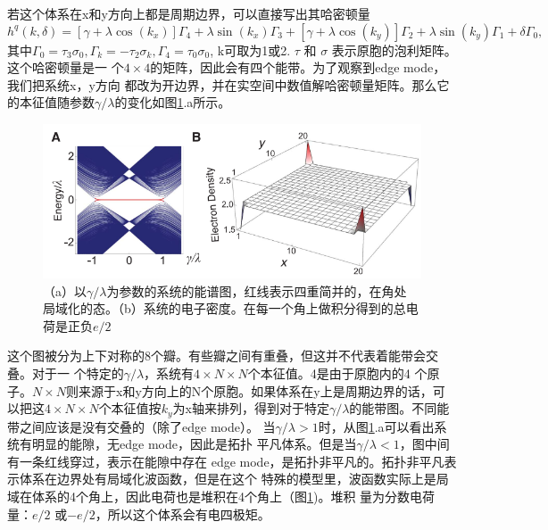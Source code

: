若这个体系在x和y方向上都是周期边界，可以直接写出其哈密顿量
\begin{equation}
h^{q}(k, \delta)=\left[\gamma+\lambda \cos \left(k_{x}\right)\right] \Gamma_{4}+\lambda \sin \left(k_{x}\right) \Gamma_{3}+\left[\gamma+\lambda \cos \left(k_{y}\right)\right] \Gamma_{2}+\lambda \sin \left(k_{y}\right) \Gamma_{1}+\delta \Gamma_{0},
\end{equation}
其中$\Gamma_0 = \tau_3 \sigma_0, \Gamma_k = - \tau_2 \sigma_k, \Gamma_4 = \tau_0
\sigma_0$, k可取为1或2. $\tau$ 和 $\sigma$ 表示原胞的泡利矩阵。这个哈密顿量是一
个$4 \times 4$的矩阵，因此会有四个能带。为了观察到edge mode，我们把系统x，y方向
都改为开边界，并在实空间中数值解哈密顿量矩阵。那么它的本征值随参数$\gamma/\lambda$的变化如图\ref{hotiband}.a所示。
 \begin {figure}[tbp]
\centering 
\includegraphics[width=14cm]{./images/HOTIBand.png} 
\caption{（a）以$\gamma / \lambda$为参数的系统的能谱图，红线表示四重简并的，在角处
局域化的态。（b）系统的电子密度。在每一个角上做积分得到的总电荷是正负$e/ 2$}
\label{hotiband}
\end {figure} 

这个图被分为上下对称的8个瓣。有些瓣之间有重叠，但这并不代表着能带会交叠。对于一
个特定的$\gamma/ \lambda$，系统有$4 \times N \times N$个本征值。4是由于原胞内的4
个原子。$N \times N$则来源于x和y方向上的N个原胞。如果体系在y上是周期边界的话，可
以把这$4 \times N \times N$个本征值按$k_y$为x轴来排列，得到对于特定$\gamma/ \lambda $的能带图。不同能带之间应该是没有交叠的（除了edge mode）。
当$\gamma/ \lambda > 1$时，从图\ref{hotiband}.a可以看出系统有明显的能隙，无edge mode，因此是拓扑
平凡体系。但是当$\gamma/ \lambda < 1$，图中间有一条红线穿过，表示在能隙中存在
edge mode，是拓扑非平凡的。拓扑非平凡表示体系在边界处有局域化波函数，但是在这个
特殊的模型里，波函数实际上是局域在体系的4个角上，因此电荷也是堆积在4个角上（图\ref{hotiband})。堆积
量为分数电荷量：$e / 2$ 或$-e/2$，所以这个体系会有电四极矩。
